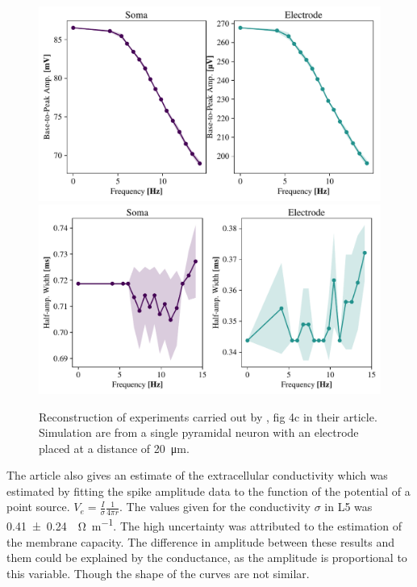 \documentclass[altfont, fleqn]{uiophd}
\begin{document}
\begin{figure}[h]
    \begin{center}
        \includegraphics[width=\linewidth]{images/sec_4/freq_amp_soma_elec.pdf}
        \includegraphics[width=\linewidth]{images/sec_4/freq_width_soma_elec.pdf}
        \caption{
            Reconstruction of experiments carried out by 
            \textcite{anastassiou_cell_2015}, 
            fig 4c in their article. 
            Simulation are from a single pyramidal neuron with an electrode placed
            at a distance of 
            \SI{20}{\micro\metre}.
        }
        \label{fig:4_width_amp_frequency}
    \end{center}
\end{figure}

The article also gives an estimate of the extracellular conductivity
which was estimated by fitting the spike amplitude data to the 
function of the potential of a point source. 
$V_e = \frac{I}{\sigma} \frac{1}{4 \pi r}$. 
The values given for the conductivity $\sigma$ in L5 was 
\SI[separate-uncertainty = true]{0.41 \pm 0.24}{\per\ohm\per\metre}.
The high uncertainty was attributed to the estimation of 
the membrane capacity.
The difference in amplitude between these results and them could 
be explained by the conductance, as the amplitude is proportional 
to this variable. 
Though the shape of the curves are not similar.
\newline
\end{document}
